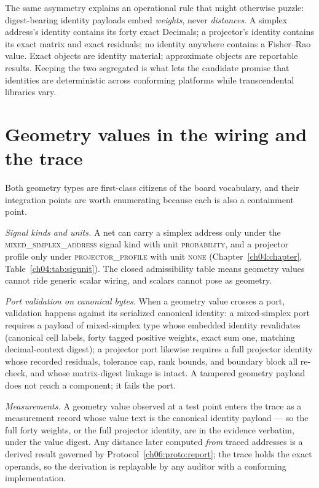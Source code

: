 The same asymmetry explains an operational rule that might otherwise
puzzle: digest-bearing identity payloads embed \emph{weights}, never
\emph{distances}. A simplex address's identity contains its forty exact
Decimals; a projector's identity contains its exact matrix and exact
residuals; no identity anywhere contains a Fisher--Rao value. Exact
objects are identity material; approximate objects are reportable
results. Keeping the two segregated is what lets the candidate promise
that identities are deterministic across conforming platforms while
transcendental libraries vary.

\section{Geometry values in the wiring and the trace}
\label{ch06:sec:wiring}

Both geometry types are first-class citizens of the board vocabulary,
and their integration points are worth enumerating because each is also
a containment point.

\emph{Signal kinds and units.} A net can carry a simplex address only
under the \textsc{mixed\_simplex\_address} signal kind with unit
\textsc{probability}, and a projector profile only under
\textsc{projector\_profile} with unit \textsc{none}
(Chapter~\ref{ch04:chapter}, Table~\ref{ch04:tab:sigunit}). The closed
admissibility table means geometry values cannot ride generic scalar
wiring, and scalars cannot pose as geometry.

\emph{Port validation on canonical bytes.} When a geometry value
crosses a port, validation happens against its serialized canonical
identity: a mixed-simplex port requires a payload of mixed-simplex
type whose embedded identity revalidates (canonical cell labels, forty
tagged positive weights, exact sum one, matching decimal-context
digest); a projector port likewise requires a full projector identity
whose recorded residuals, tolerance cap, rank bounds, and boundary
block all re-check, and whose matrix-digest linkage is intact. A
tampered geometry payload does not reach a component; it fails the
port.

\emph{Measurements.} A geometry value observed at a test point enters
the trace as a measurement record whose value text is the canonical
identity payload --- so the full forty weights, or the full projector
identity, are in the evidence verbatim, under the value digest. Any
distance later computed \emph{from} traced addresses is a derived
result governed by Protocol~\ref{ch06:proto:report}; the trace holds
the exact operands, so the derivation is replayable by any auditor
with a conforming implementation.

